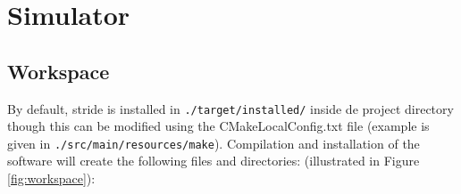 \chapter{Simulator}
\label{chap:simulator}


\section{Workspace}

By default, stride is installed in \texttt{./target/installed/} inside de project directory though this can be modified using the CMakeLocalConfig.txt file (example is given in \texttt{./src/main/resources/make}). Compilation and installation of the software will create the following files and directories: (illustrated in Figure \ref{fig:workspace}):

